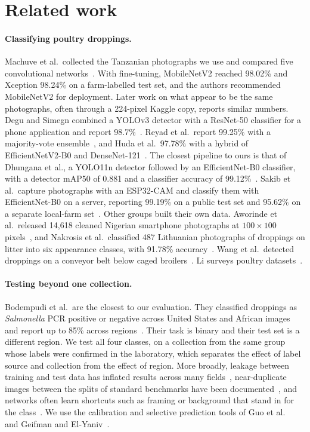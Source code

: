 \section{Related work}
\label{sec:related}

\paragraph{Classifying poultry droppings.} Machuve et al.\ collected the Tanzanian photographs we use and compared
five convolutional networks~\cite{machuve2022}. With fine-tuning, MobileNetV2 reached 98.02\% and Xception 98.24\% on
a farm-labelled test set, and the authors recommended MobileNetV2 for deployment. Later work on what appear to be the same
photographs, often through a 224-pixel Kaggle copy, reports similar numbers. Degu and Simegn combined a YOLOv3 detector with a
ResNet-50 classifier for a phone application and report 98.7\%~\cite{degu2023}. Reyad et al.\ report 99.25\% with a
majority-vote ensemble~\cite{reyad2024}, and Huda et al.\ 97.78\% with a hybrid of EfficientNetV2-B0 and
DenseNet-121~\cite{huda2024}. The closest pipeline to ours is that of Dhungana et al., a YOLO11n detector followed by
an EfficientNet-B0 classifier, with a detector mAP50 of 0.881 and a classifier accuracy of 99.12\%~\cite{dhungana2025}.
Sakib et al.\ capture photographs with an ESP32-CAM and classify them with EfficientNet-B0 on a server, reporting
99.19\% on a public test set and 95.62\% on a separate local-farm set~\cite{sakib2026}. Other groups built their own
data. Aworinde et al.\ released 14,618 cleaned Nigerian smartphone photographs at $100\times100$
pixels~\cite{aworinde2023}, and Nakrosis et al.\ classified 487 Lithuanian photographs of droppings on litter into six
appearance classes, with 91.78\% accuracy~\cite{nakrosis2023}. Wang et al.\ detected droppings on a conveyor belt
below caged broilers~\cite{wang2019}. Li surveys poultry datasets~\cite{li2025survey}.

\paragraph{Testing beyond one collection.} Bodempudi et al.\ are the closest to our evaluation. They classified
droppings as \emph{Salmonella} PCR positive or negative across United States and African images and report up to
85\% across regions~\cite{bodempudi2026}. Their task is binary and their test set is a different region. We test all
four classes, on a collection from the same group whose labels were confirmed in the laboratory, which separates the
effect of label source and collection from the effect of region. More broadly, leakage between training and test data
has inflated results across many fields~\cite{kapoor2023}, near-duplicate images between the splits of standard
benchmarks have been documented~\cite{barz2020}, and networks often learn shortcuts such as framing or background that
stand in for the class~\cite{geirhos2020}. We use the calibration and selective prediction tools of Guo et
al.~\cite{guo2017} and Geifman and El-Yaniv~\cite{geifman2017}.

